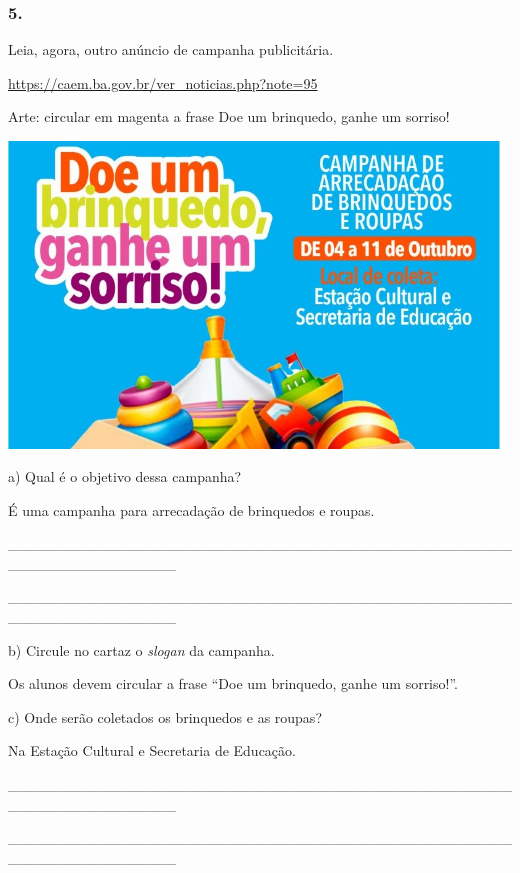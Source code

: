 \subsubsection{5. }\label{section-43}

Leia, agora, outro anúncio de campanha publicitária.

\url{https://caem.ba.gov.br/ver_noticias.php?note=95}

Arte: circular em magenta a frase Doe um brinquedo, ganhe um sorriso!

\includegraphics[width=5.12500in,height=3.20313in]{media/image11.jpeg}

a) Qual é o objetivo dessa campanha?

É uma campanha para arrecadação de brinquedos e roupas.

\protect\hypertarget{_Hlk127709586}{}{}\_\_\_\_\_\_\_\_\_\_\_\_\_\_\_\_\_\_\_\_\_\_\_\_\_\_\_\_\_\_\_\_\_\_\_\_\_\_\_\_\_\_\_\_\_\_\_\_\_\_\_\_\_\_\_\_\_\_\_\_\_\_\_\_

\_\_\_\_\_\_\_\_\_\_\_\_\_\_\_\_\_\_\_\_\_\_\_\_\_\_\_\_\_\_\_\_\_\_\_\_\_\_\_\_\_\_\_\_\_\_\_\_\_\_\_\_\_\_\_\_\_\_\_\_\_\_\_\_

b) Circule no cartaz o \emph{slogan} da campanha.

Os alunos devem circular a frase ``Doe um brinquedo, ganhe um
sorriso!''.

c) Onde serão coletados os brinquedos e as roupas?

Na Estação Cultural e Secretaria de Educação.

\_\_\_\_\_\_\_\_\_\_\_\_\_\_\_\_\_\_\_\_\_\_\_\_\_\_\_\_\_\_\_\_\_\_\_\_\_\_\_\_\_\_\_\_\_\_\_\_\_\_\_\_\_\_\_\_\_\_\_\_\_\_\_\_

\_\_\_\_\_\_\_\_\_\_\_\_\_\_\_\_\_\_\_\_\_\_\_\_\_\_\_\_\_\_\_\_\_\_\_\_\_\_\_\_\_\_\_\_\_\_\_\_\_\_\_\_\_\_\_\_\_\_\_\_\_\_\_\_

